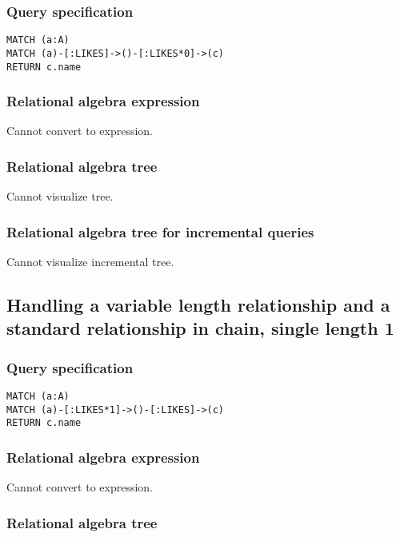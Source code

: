 \subsubsection*{Query specification}

\begin{lstlisting}
MATCH (a:A)
MATCH (a)-[:LIKES]->()-[:LIKES*0]->(c)
RETURN c.name
\end{lstlisting}

\subsubsection*{Relational algebra expression}

Cannot convert to expression.

\subsubsection*{Relational algebra tree}

Cannot visualize tree.

\subsubsection*{Relational algebra tree for incremental queries}

Cannot visualize incremental tree.

\subsection{Handling a variable length relationship and a standard relationship in chain, single length 1}

\subsubsection*{Query specification}

\begin{lstlisting}
MATCH (a:A)
MATCH (a)-[:LIKES*1]->()-[:LIKES]->(c)
RETURN c.name
\end{lstlisting}

\subsubsection*{Relational algebra expression}

Cannot convert to expression.

\subsubsection*{Relational algebra tree}

